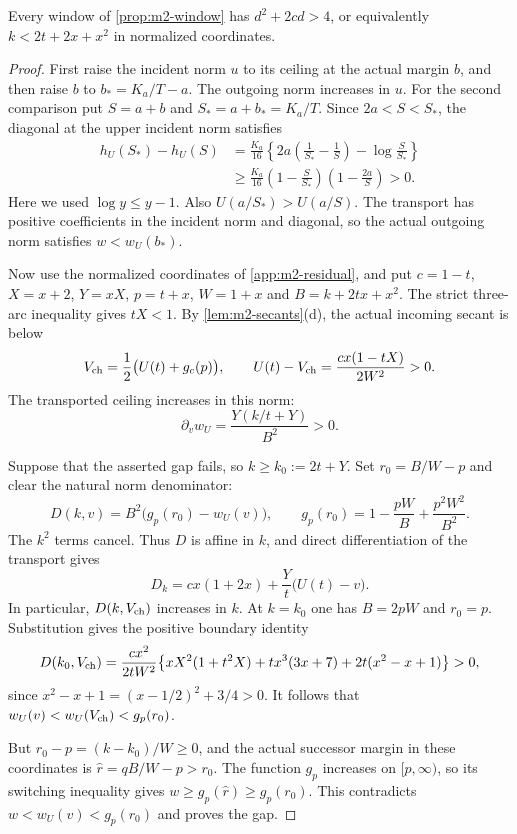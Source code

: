 \begin{samepage}
\begin{lemma}\label{lem:m2-centre-gap}
Every window of \cref{prop:m2-window} has $d^2+2cd>4$,
or equivalently $k<2t+2x+x^2$ in normalized coordinates.
\end{lemma}

\begin{proof}
First raise the incident norm $u$ to its ceiling at the actual margin $b$,
and then raise $b$ to $b_*=K_a/T-a$.
The outgoing norm increases in $u$. For the second comparison put
$S=a+b$ and $S_*=a+b_*=K_a/T$. Since $2a<S<S_*$, the diagonal at the upper incident norm satisfies
\begin{align*}
 h_U(S_*)-h_U(S)
 &=\frac{K_a}{16}\left\{2a\left(\frac1{S_*}-\frac1S\right)-\log\frac S{S_*}\right\}\\
 &\ge\frac{K_a}{16}\left(1-\frac S{S_*}\right)\left(1-\frac{2a}S\right)>0.
\end{align*}
Here we used $\log y\le y-1$. Also $U(a/S_*)>U(a/S)$.
The transport has positive coefficients in the incident norm and diagonal,
so the actual outgoing norm satisfies $w<w_U(b_*)$.

Now use the normalized coordinates of \cref{app:m2-residual}, and put
$c=1-t$, $X=x+2$, $Y=xX$, $p=t+x$, $W=1+x$ and $B=k+2tx+x^2$.
The strict three-arc inequality gives $tX<1$.
By \cref{lem:m2-secants}(d), the actual incoming secant is below
\[
 V_{\rm ch}=\frac12\bigl(U(t)+g_c(p)\bigr),\qquad
 U(t)-V_{\rm ch}=\frac{cx(1-tX)}{2W^2}>0.
\]
The transported ceiling increases in this norm:
\[
 \partial_vw_U=\frac{Y(k/t+Y)}{B^2}>0.
\]

Suppose that the asserted gap fails, so $k\ge k_0:=2t+Y$.
Set $r_0=B/W-p$ and clear the natural norm denominator:
\[
 D(k,v)=B^2\bigl(g_p(r_0)-w_U(v)\bigr),\qquad
 g_p(r_0)=1-\frac{pW}{B}+\frac{p^2W^2}{B^2}.
\]
The $k^2$ terms cancel. Thus $D$ is affine in $k$, and direct
differentiation of the transport gives
\[
 D_k=cx(1+2x)+\frac Yt\bigl(U(t)-v\bigr).
\]
In particular, $D(k,V_{\rm ch})$ increases in $k$.
At $k=k_0$ one has $B=2pW$ and $r_0=p$. Substitution gives the
positive boundary identity
\begin{align*}
 D(k_0,V_{\rm ch})
 =\frac{cx^2}{2tW^2}\bigl\{
   xX^2(1+t^2X)+tx^3(3x+7)+2t(x^2-x+1)\bigr\}>0,
\end{align*}
since $x^2-x+1=(x-1/2)^2+3/4>0$.
It follows that $w_U(v)<w_U(V_{\rm ch})<g_p(r_0)$.

But $r_0-p=(k-k_0)/W\ge0$, and the actual successor margin in
these coordinates is $\hat r=qB/W-p>r_0$.
The function $g_p$ increases on $[p,\infty)$, so its switching inequality
gives $w\ge g_p(\hat r)\ge g_p(r_0)$.
This contradicts $w<w_U(v)<g_p(r_0)$ and proves the gap.
\end{proof}
\end{samepage}

